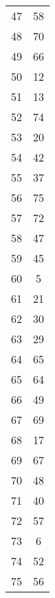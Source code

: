 \begin{table}
\begin{tabular}{c c }
47 & 58 \\
48 & 70 \\
49 & 66 \\
50 & 12 \\
51 & 13 \\
52 & 74 \\
53 & 20 \\
54 & 42 \\
55 & 37 \\
56 & 75 \\
57 & 72 \\
58 & 47 \\
59 & 45 \\
60 & 5 \\
61 & 21 \\
62 & 30 \\
63 & 29 \\
64 & 65 \\
65 & 64 \\
66 & 49 \\
67 & 69 \\
68 & 17 \\
69 & 67 \\
70 & 48 \\
71 & 40 \\
72 & 57 \\
73 & 6 \\
74 & 52 \\
75 & 56 \\
\hline
\end{tabular}
\end{table}